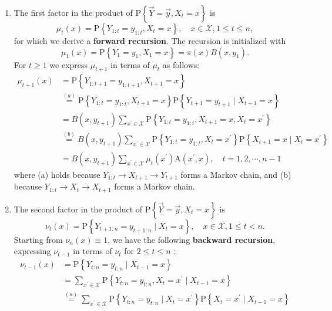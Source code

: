 \documentclass[11pt]{elegantbook}
\begin{document}
\begin{enumerate}[(1)]
    \item The first factor in the product of $\mathrm{P}\left\{\vec{Y}=\vec{y}, X_t=x\right\}$ is
    $$
    \mu_t(x)=\mathrm{P}\left\{Y_{1: t}=y_{1: t}, X_t=x\right\}, \quad x \in \mathcal{X}, 1 \leq t \leq n,
    $$
    for which we derive a \textbf{forward recursion}. The recursion is initialized with
    $$
    \mu_1(x)=\mathrm{P}\left\{Y_1=y_1, X_1=x\right\}=\pi(x) B\left(x, y_1\right) .
    $$
    For $t \geq 1$ we express $\mu_{t+1}$ in terms of $\mu_t$ as follows:
    $$
    \begin{aligned}
    \mu_{t+1}(x) &=\mathrm{P}\left\{Y_{1: t+1}=y_{1: t+1}, X_{t+1}=x\right\} \\
    & \stackrel{(a)}{=} \mathrm{P}\left\{Y_{1: t}=y_{1: t}, X_{t+1}=x\right\} \mathrm{P}\left\{Y_{t+1}=y_{t+1} \mid X_{t+1}=x\right\} \\
    &=B\left(x, y_{t+1}\right) \sum_{x^{\prime} \in \mathcal{X}} \mathrm{P}\left\{Y_{1: t}=y_{1: t}, X_{t+1}=x, X_t=x^{\prime}\right\} \\
    & \stackrel{(b)}{=} B\left(x, y_{t+1}\right) \sum_{x^{\prime} \in \mathcal{X}} \mathrm{P}\left\{Y_{1: t}=y_{1: t}, X_t=x^{\prime}\right\} \mathrm{P}\left\{X_{t+1}=x \mid X_t=x^{\prime}\right\} \\
    &=B\left(x, y_{t+1}\right) \sum_{x^{\prime} \in \mathcal{X}} \mu_t\left(x^{\prime}\right) \mathrm{A}\left(x^{\prime}, x\right), \quad t=1,2, \cdots, n-1
    \end{aligned}
    $$
    where (a) holds because $Y_{1: t} \rightarrow X_{t+1} \rightarrow Y_{t+1}$ forms a Markov chain, and (b) because $Y_{1: t} \rightarrow X_t \rightarrow X_{t+1}$ forms a Markov chain.
    \item The second factor in the product of $\mathrm{P}\left\{\vec{Y}=\vec{y}, X_t=x\right\}$ is
    $$
    \nu_t(x)=\mathrm{P}\left\{Y_{t+1: n}=y_{t+1: n} \mid X_t=x\right\}, \quad x \in \mathcal{X}, 1 \leq t<n .
    $$
    Starting from $\nu_n(x) \equiv 1$, we have the following \textbf{backward recursion}, expressing $\nu_{t-1}$ in terms of $\nu_t$ for $2 \leq t \leq n$ :
    $$
    \begin{aligned}
    \nu_{t-1}(x) &=\mathrm{P}\left\{Y_{t: n}=y_{t: n} \mid X_{t-1}=x\right\} \\
    &=\sum_{x^{\prime} \in \mathcal{X}} \mathrm{P}\left\{Y_{t: n}=y_{t: n}, X_t=x^{\prime} \mid X_{t-1}=x\right\} \\
    & \stackrel{(a)}{=} \sum_{x^{\prime} \in \mathcal{X}} \mathrm{P}\left\{Y_{t: n}=y_{t: n} \mid X_t=x^{\prime}\right\} \mathrm{P}\left\{X_t=x^{\prime} \mid X_{t-1}=x\right\} \\

\end{aligned}$$
\end{enumerate}
\end{document}

